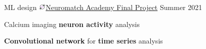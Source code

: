 \begin{cventries}
  \cventry
    {ML design}
    {\includegraphics[width=3.5mm]{snippy-nma.png}\href{https://portal.neuromatchacademy.org/certificate/a6398835-adc9-4528-99d6-347675c05ffd}{Neuromatch Academy Final Project}}
    {}
    {Summer 2021}
    {
      \begin{cvitems}
        \item {Calcium imaging \textbf{neuron activity} analysis}
        \item {\textbf{Convolutional network} for \textbf{time series} analysis}
      \end{cvitems}
    }

\end{cventries}